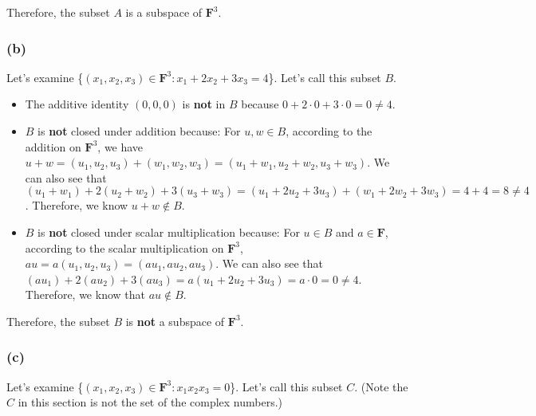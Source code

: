 \documentclass[12pt, letterpaper, oneside]{book}
\begin{document}
Therefore, the subset $A$ is a subspace of $\mathbf{F}^3$.

\subsubsection*{(b)}

Let's examine \{$(x_1, x_2, x_3) \in \mathbf{F}^3: x_1 + 2x_2 + 3x_3 = 4$\}.
Let's call this subset $B$.

\begin{itemize}
  \item The additive identity $(0, 0, 0)$ is \textbf{not} in $B$ because $0 +
    2 \cdot 0 + 3 \cdot 0 = 0 \neq 4$.
  \item $B$ is \textbf{not} closed under addition because: For $u, w \in B$,
    according to the addition on $\mathbf{F}^3$, we have $u + w = (u_1, u_2,
    u_3) + (w_1, w_2, w_3) = (u_1 + w_1, u_2 + w_2, u_3 + w_3)$. We can also
    see that $(u_1 + w_1) + 2(u_2 + w_2) + 3(u_3 + w_3) = (u_1 + 2u_2 + 3u_3) +
    (w_1 + 2w_2 + 3w_3) = 4 + 4 = 8 \neq 4$. Therefore, we know $u + w \notin
    B$.
  \item $B$ is \textbf{not} closed under scalar multiplication because: For $u
    \in B$ and $a \in \mathbf{F}$, according to the scalar multiplication on
    $\mathbf{F}^3$, $au = a(u_1, u_2, u_3) = (a u_1, a u_2, a u_3)$. We can
    also see that $(a u_1) + 2(a u_2) + 3(a u_3) = a(u_1 + 2u_2 + 3u_3) =
    a \cdot 0 = 0 \neq 4$. Therefore, we know that $au \notin B$.
\end{itemize}

Therefore, the subset $B$ is \textbf{not} a subspace of $\mathbf{F}^3$.

\subsubsection*{(c)}

Let's examine \{$(x_1, x_2, x_3) \in \mathbf{F}^3: x_1 x_2 x_3 = 0$\}. Let's
call this subset $C$. (Note the $C$ in this section is not the set of the
complex numbers.)
\end{document}

